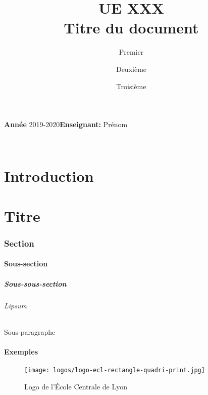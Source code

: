 \documentclass[11pt,a4paper]{article}
\author{Premier \sc{Auteur} \and Deuxième \sc{Auteur} \and Troisième \sc{Auteur}}
\title{\vfill UE XXX\\\bf{Titre du document}}
\begin{document}
\begin{titlepage}
\maketitle
\thispagestyle{empty}
\vfill
\textbf{Année} 2019-2020\hfill\textbf{Enseignant:} Prénom 
\end{titlepage}

~
\tableofcontents

\pagebreak

\part*{Introduction}
\lipsum[18]

\part{Titre} %
\section{Section}
\subsection{Sous-section}
\subsubsection{Sous-sous-section}
\paragraph{Lipsum}\lipsum[1-3]
\subparagraph{Sous-paragraphe}\lipsum[4-10]

\subsection{Exemples}
\begin{figure} %
    \centering
    \texttt{[image: logos/logo-ecl-rectangle-quadri-print.jpg]}
    \caption{Logo de l'\' Ecole Centrale de Lyon}
    \label{fig:logo_ecl}
\end{figure}
\end{document}
